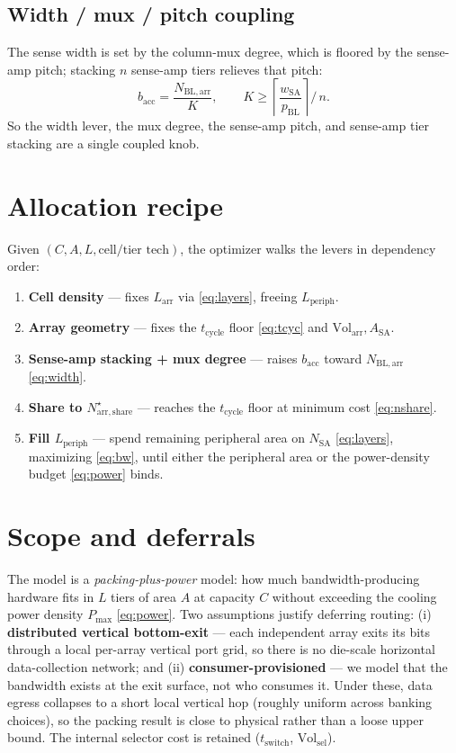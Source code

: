 \documentclass[11pt]{article}
\newcommand{\Nshare}{N_{\mathrm{arr,share}}}
\newcommand{\Nsa}{N_{\mathrm{SA}}}
\newcommand{\Nbl}{N_{\mathrm{BL,arr}}}
\newcommand{\tcyc}{t_{\mathrm{cycle}}}
\newcommand{\tsw}{t_{\mathrm{switch}}}
\newcommand{\Volarr}{\mathrm{Vol}_{\mathrm{arr}}}
\newcommand{\Volsel}{\mathrm{Vol}_{\mathrm{sel}}}
\newcommand{\bacc}{b_{\mathrm{acc}}}          %
\newcommand{\Larr}{L_{\mathrm{arr}}}
\newcommand{\Lper}{L_{\mathrm{periph}}}
\newcommand{\Asa}{A_{\mathrm{SA}}}
\newcommand{\Pmax}{P_{\max}}
\begin{document}
\subsection{Width / mux / pitch coupling}
The sense width is set by the column-mux degree, which is floored by the
sense-amp pitch; stacking $n$ sense-amp tiers relieves that pitch:
\begin{equation}
  \bacc = \frac{\Nbl}{K},
  \qquad
  K \ge \left\lceil \frac{w_{\mathrm{SA}}}{p_{\mathrm{BL}}} \right\rceil \Big/\, n .
  \label{eq:width}
\end{equation}
So the width lever, the mux degree, the sense-amp pitch, and sense-amp tier
stacking are a single coupled knob.

\section{Allocation recipe}
\label{sec:recipe}
Given $(C,A,L,\text{cell/tier tech})$, the optimizer walks the levers in
dependency order:
\begin{enumerate}[nosep]
  \item \textbf{Cell density} --- fixes $\Larr$ via \eqref{eq:layers}, freeing $\Lper$.
  \item \textbf{Array geometry} --- fixes the $\tcyc$ floor \eqref{eq:tcyc} and $\Volarr,\Asa$.
  \item \textbf{Sense-amp stacking + mux degree} --- raises $\bacc$ toward $\Nbl$ \eqref{eq:width}.
  \item \textbf{Share to $\Nshare^\star$} --- reaches the $\tcyc$ floor at minimum cost \eqref{eq:nshare}.
  \item \textbf{Fill $\Lper$} --- spend remaining peripheral area on $\Nsa$ \eqref{eq:layers}, maximizing \eqref{eq:bw}, until either the peripheral area or the power-density budget \eqref{eq:power} binds.
\end{enumerate}

\section{Scope and deferrals}
\label{sec:scope}
The model is a \emph{packing-plus-power} model: how much bandwidth-producing
hardware fits in $L$ tiers of area $A$ at capacity $C$ without exceeding the
cooling power density $\Pmax$ \eqref{eq:power}. Two assumptions justify deferring
routing:
(i) \textbf{distributed vertical bottom-exit} --- each independent array exits
its bits through a local per-array vertical port grid, so there is no die-scale
horizontal data-collection network; and (ii) \textbf{consumer-provisioned} --- we
model that the bandwidth exists at the exit surface, not who consumes it. Under
these, data egress collapses to a short local vertical hop (roughly uniform
across banking choices), so the packing result is close to physical rather than a
loose upper bound. The internal selector cost is retained ($\tsw$, $\Volsel$).
\end{document}
